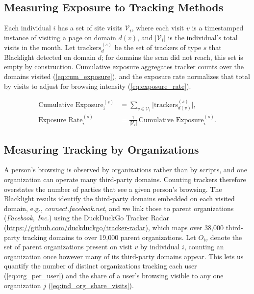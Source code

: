 \documentclass[12pt, letterpaper]{article}
\begin{document}
\subsection{Measuring Exposure to Tracking Methods}
\label{sec:measuring_exposure}
 
Each individual $i$ has a set of site visits $\mathcal{V}_i$, where each visit $v$ is a timestamped instance of visiting a page on domain $d(v)$, and $\lvert \mathcal{V}_i \rvert$ is the individual's total visits in the month. Let $\mathrm{trackers}^{(s)}_{d}$ be the set of trackers of type $s$ that Blacklight detected on domain $d$; for domains the scan did not reach, this set is empty by construction. Cumulative exposure aggregates tracker counts over the domains visited (\cref{eq:cum_exposure}), and the exposure rate normalizes that total by visits to adjust for browsing intensity (\cref{eq:exposure_rate}).
 
\begin{align}
\text{Cumulative Exposure}_i^{(s)} &=
    \sum_{v \in \mathcal{V}_i}
    \bigl\lvert \mathrm{trackers}^{(s)}_{d(v)} \bigr\rvert,
    \label{eq:cum_exposure} \\
\text{Exposure Rate}_i^{(s)} &=
    \frac{1}{\lvert \mathcal{V}_i \rvert}
    \,\text{Cumulative Exposure}_i^{(s)}.
    \label{eq:exposure_rate}
\end{align}

\subsection{Measuring Tracking by Organizations}
\label{sec:browsing_history}
 
A person's browsing is observed by organizations rather than by scripts, and one organization can operate many third-party domains.
Counting trackers therefore overstates the number of parties that see a given person's browsing. The Blacklight results identify the third-party domains embedded on each visited domain, e.g., \textit{connect.facebook.net}, and we link those to parent organizations (\textit{Facebook, Inc.}) using the DuckDuckGo Tracker Radar (\url{https://github.com/duckduckgo/tracker-radar}), which maps over 38,000 third-party tracking domains to over 19,000 parent organizations. Let $O_{iv}$ denote the set of parent organizations present on visit $v$ by individual $i$, counting an organization once however many of its third-party domains appear. This lets us quantify the number of distinct organizations tracking each user (\cref{eq:org_per_user}) and the share of a user's browsing visible to any one organization $j$ (\cref{eq:ind_org_share_visits}).
\end{document}

